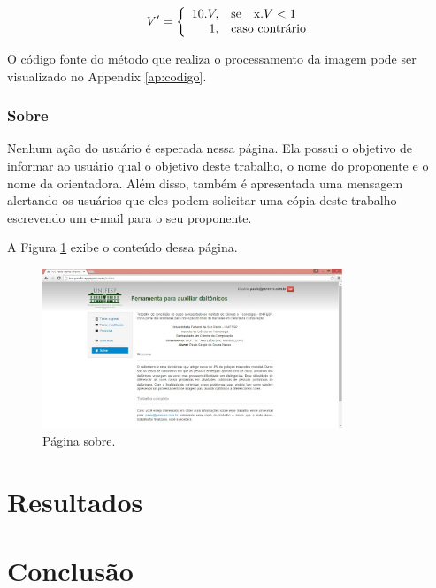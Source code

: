 \documentclass[	12pt, Times, openright, twoside, a4paper, english, brazil]{abntex2}
\begin{document}
\begin{equation}
\label{eq:exemploV}
V'=\left\{
\begin{array}{rl}
       10 . V,&\mbox{se}\quad $x$ . V < 1 \\
       1,&\mbox{caso contrário}
\end{array}\right.
\end{equation}


O código fonte do método que realiza o processamento da imagem pode ser visualizado no Appendix \ref{ap:codigo}.


\subsection{Sobre}

Nenhum ação do usuário é esperada nessa página. Ela possui o objetivo de informar ao usuário qual o objetivo deste trabalho, o nome do proponente e o nome da orientadora. Além disso, também é apresentada uma mensagem alertando os usuários que eles podem solicitar uma cópia deste trabalho escrevendo um e-mail para o seu proponente.

A Figura \ref{fig:figuraSobre} exibe o conteúdo dessa página.

\begin{figure}[!htb]
\centering \includegraphics[width=0.8\textwidth]{telaSobre.jpg}
\caption{Página sobre.} \label{fig:figuraSobre}
\end{figure}

\chapter{Resultados}
\label{cap:resultados}
\chapter{Conclusão}
\postextual
\end{document}
